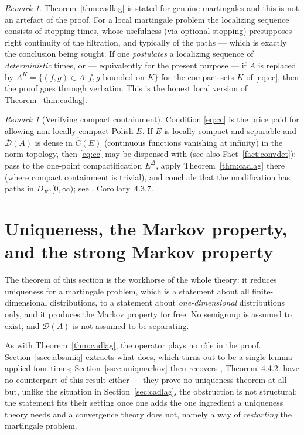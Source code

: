 \documentclass[11pt,a4paper]{article}
\theoremstyle{plain}
\theoremstyle{definition}
\theoremstyle{remark}
\newtheorem{remark}[theorem]{Remark}
\newcommand{\dom}{\mathcal{D}}                 %
\newcommand{\EK}{\cite{EK86}}
\newcommand{\CPS}{\cite{CPS23}}
\begin{document}
\begin{remark}
  \label{rem:cadlaglocal}
  Theorem~\ref{thm:cadlag} is stated for genuine martingales and this is not an
  artefact of the proof.  For a local martingale problem the localizing sequence
  consists of stopping times, whose usefulness (via optional stopping) presupposes
  right continuity of the filtration, and typically of the paths --- which is
  exactly the conclusion being sought.  If one \emph{postulates} a localizing
  sequence of \emph{deterministic} times, or --- equivalently for the present
  purpose --- if $A$ is replaced by
  $A^{K} = \{(f,g) \in A : f,g \text{ bounded on } K\}$ for the compact sets $K$
  of \eqref{eq:cc}, then the proof goes through verbatim.  This is the honest
  local version of Theorem~\ref{thm:cadlag}.
\end{remark}

\begin{remark}[Verifying compact containment]
  \label{rem:ccverify}
  Condition \eqref{eq:cc} is the price paid for allowing non-locally-compact
  Polish $E$.  If $E$ is locally compact and separable and $\dom(A)$ is dense in
  $\hat{C}(E)$ (continuous functions vanishing at infinity) in the norm topology,
  then \eqref{eq:cc} may be dispensed with (see also Fact~\ref{fact:convdet}):
  pass to the one-point
  compactification $E^\Delta$, apply Theorem~\ref{thm:cadlag} there (where
  compact containment is trivial), and conclude that the modification has paths in
  $D_{E^\Delta}[0,\infty)$; see \EK, Corollary~4.3.7.
\end{remark}

\section{Uniqueness, the Markov property, and the strong Markov property}
\label{sec:uniqueness}

The theorem of this section is the workhorse of the whole theory: it reduces
uniqueness for a martingale problem, which is a statement about all
finite-dimensional distributions, to a statement about \emph{one-dimensional}
distributions only, and it produces the Markov property for free.  No semigroup
is assumed to exist, and $\dom(A)$ is not assumed to be separating.

As with Theorem~\ref{thm:cadlag}, the operator plays no r\^ole in the proof.
Section~\ref{ssec:absuniq} extracts what does, which turns out to be a single
lemma applied four times; Section~\ref{ssec:uniqmarkov} then recovers
\EK, Theorem~4.4.2.  \CPS{} have no counterpart of this result either --- they
prove no uniqueness theorem at all --- but, unlike the situation in
Section~\ref{sec:cadlag}, the obstruction is not structural: the statement fits
their setting once one adds the one ingredient a uniqueness theory needs and a
convergence theory does not, namely a way of \emph{restarting} the martingale
problem.
\end{document}
